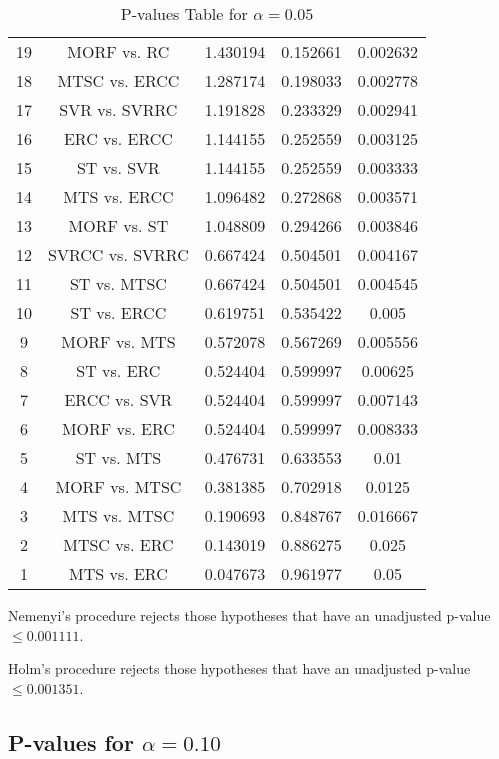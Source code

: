 \documentclass[a4paper,10pt]{article}
\begin{document}
\begin{landscape}
\begin{table}[!htp]
\begin{tabular}{ccccc}
19&MORF vs. RC&1.430194&0.152661&0.002632\\
18&MTSC vs. ERCC&1.287174&0.198033&0.002778\\
17&SVR vs. SVRRC&1.191828&0.233329&0.002941\\
16&ERC vs. ERCC&1.144155&0.252559&0.003125\\
15&ST vs. SVR&1.144155&0.252559&0.003333\\
14&MTS vs. ERCC&1.096482&0.272868&0.003571\\
13&MORF vs. ST&1.048809&0.294266&0.003846\\
12&SVRCC vs. SVRRC&0.667424&0.504501&0.004167\\
11&ST vs. MTSC&0.667424&0.504501&0.004545\\
10&ST vs. ERCC&0.619751&0.535422&0.005\\
9&MORF vs. MTS&0.572078&0.567269&0.005556\\
8&ST vs. ERC&0.524404&0.599997&0.00625\\
7&ERCC vs. SVR&0.524404&0.599997&0.007143\\
6&MORF vs. ERC&0.524404&0.599997&0.008333\\
5&ST vs. MTS&0.476731&0.633553&0.01\\
4&MORF vs. MTSC&0.381385&0.702918&0.0125\\
3&MTS vs. MTSC&0.190693&0.848767&0.016667\\
2&MTSC vs. ERC&0.143019&0.886275&0.025\\
1&MTS vs. ERC&0.047673&0.961977&0.05\\
\hline
\end{tabular}
\caption{P-values Table for $\alpha=0.05$}
\end{table}Nemenyi's procedure rejects those hypotheses that have an unadjusted p-value $\le0.001111$.

Holm's procedure rejects those hypotheses that have an unadjusted p-value $\le0.001351$.

\pagebreak

\subsection{P-values for $\alpha=0.10$}


\end{landscape}
\end{document}
